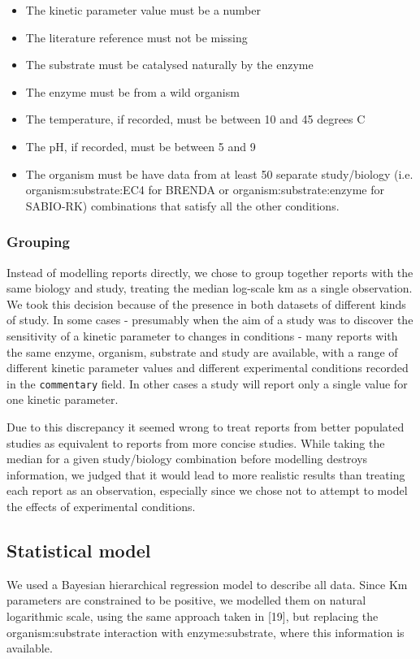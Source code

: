 \documentclass[11pt]{article}
\makeatletter
\newcommand{\citeprocitem}[2]{\hyper@linkstart{cite}{citeproc_bib_item_#1}#2\hyper@linkend}
\makeatother
\begin{document}
\begin{itemize}
\item The kinetic parameter value must be a number
\item The literature reference must not be missing
\item The substrate must be catalysed naturally by the enzyme
\item The enzyme must be from a wild organism
\item The temperature, if recorded, must be between 10 and 45 degrees C
\item The pH, if recorded, must be between 5 and 9
\item The organism must be have data from at least 50 separate study/biology
(i.e. organism:substrate:EC4 for BRENDA or organism:substrate:enzyme for
SABIO-RK) combinations that satisfy all the other conditions.
\end{itemize}

\subsubsection{Grouping}
\label{sec:orgc5306b6}
Instead of modelling reports directly, we chose to group together reports with
the same biology and study, treating the median log-scale km as a single
observation. We took this decision because of the presence in both datasets of
different kinds of study. In some cases - presumably when the aim of a study was
to discover the sensitivity of a kinetic parameter to changes in conditions -
many reports with the same enzyme, organism, substrate and study are available,
with a range of different kinetic parameter values and different experimental
conditions recorded in the \texttt{commentary} field. In other cases a study will
report only a single value for one kinetic parameter.

Due to this discrepancy it seemed wrong to treat reports from better populated
studies as equivalent to reports from more concise studies. While taking the
median for a given study/biology combination before modelling destroys
information, we judged that it would lead to more realistic results than
treating each report as an observation, especially since we chose not to
attempt to model the effects of experimental conditions.

\subsection{Statistical model}
\label{sec:org74adbb3}
We used a Bayesian hierarchical regression model to describe all data. Since Km
parameters are constrained to be positive, we modelled them on natural
logarithmic scale, using the same approach taken in
\citeprocitem{19}{[19]}, but replacing the organism:substrate
interaction with enzyme:substrate, where this information is available.
\end{document}
